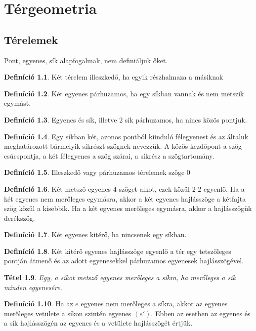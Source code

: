 \documentclass[twoside,12pt]{report}
\newtheorem{theorem}{Tétel}[section]
\theoremstyle{definition}
\newtheorem{definition}[theorem]{Definíció}
\begin{document}
\chapter{Térgeometria}
\section{Térelemek}
	Pont, egyenes, sík alapfogalmak, nem definiáljuk őket.
	\begin{definition}
		Két térelem illeszkedő, ha egyik részhalmaza a másiknak
	\end{definition}
	\begin{definition}
		Két egyenes párhuzamos, ha egy síkban vannak és nem metszik egymást.
	\end{definition}
	\begin{definition}
		Egyenes és sík, illetve 2 sík párhuzamos, ha nincs közös pontjuk.
	\end{definition}
	\begin{definition}
		Egy síkban két, azonos pontból kiinduló félegyenest és az általuk meghatározott bármelyik síkrészt szögnek nevezzük. A közös kezdőpont a szög csúcspontja, a két félegyenes a szög szárai, a síkrész a szögtartomány.
	\end{definition}
	\begin{definition}
		Illeszkedő vagy párhuzamos térelemek szöge 0\degree
	\end{definition}
	\begin{definition}
		Két metsző egyenes 4 szöget alkot, ezek közül 2-2 egyenlő. Ha a két egyenes nem merőleges egymásra, akkor a két egyenes hajlásszöge a kétfajta szög közül a kisebbik. Ha a két egyenes merőleges egymásra, akkor a hajlásszögük derékszög.
	\end{definition}
	\begin{definition}
		Két egyenes kitérő, ha nincsenek egy síkban.
	\end{definition}
	\begin{definition}
		Két kitérő egyenes hajlásszöge egyenlő a tér egy tetszőleges pontján átmenő és az adott egyenesekkel párhuzamos egyenesek hajlásszögével.
	\end{definition}
	\begin{theorem}
		Egy, a síkot metsző egyenes merőleges a síkra, ha merőleges a sík minden egyenesére.
	\end{theorem}
	\begin{definition}
		Ha az $e$ egyenes nem merőleges a síkra, akkor az egyenes merőleges vetülete a síkon
		szintén egyenes $(e')$. Ebben az esetben az egyenes és a sík hajlásszögén az egyenes és a vetülete hajlásszögét értjük.
	\end{definition}
\end{document}

